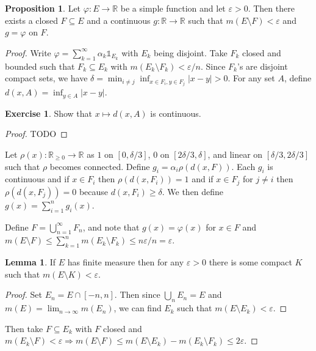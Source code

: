 \documentclass{article}
\renewcommand{\implies}{\Rightarrow}
\newcommand{\R}{\mathbb{R}}
\theoremstyle{definition} %
\numberwithin{thm}{section} %
\newtheorem{lemma}[thm]{Lemma}
\newtheorem{prop}[thm]{Proposition}
\theoremstyle{definition} %
\newtheorem{exercise}[thm]{Exercise}
\begin{document}
\begin{prop}
    Let $\varphi: E \to \R$ be a simple function and let $\varepsilon > 0$. Then there exists a closed $F \subseteq E$ and a continuous $g: \R \to \R$ such that $m(E \setminus F) < \varepsilon$ and $g = \varphi$ on $F$.
\end{prop}
\begin{proof}
Write $\varphi = \sum_{k = 1}^\infty \alpha_k \mathds{1}_{E_k}$ with $E_k$ being disjoint. Take $F_k$ closed and bounded such that $F_k \subseteq E_k$ with $m(E_k \setminus F_k) < \varepsilon / n$. Since $F_k$'s are disjoint compact sets, we have $\delta = \min_{i \neq j}\inf_{x \in F_i, y \in F_j} |x - y| > 0$. For any set $A$, define $d(x, A) = \inf_{y \in A}|x - y|$.

\begin{exercise}
    Show that $x \mapsto d(x, A)$ is continuous.
\end{exercise}
\begin{proof}
    TODO
\end{proof}

Let $\rho(x): \R_{\geq 0} \to \R$ as $1$ on $[0, \delta/3]$, 0 on $[2\delta/3, \delta]$, and linear on $[\delta/3, 2\delta/3]$ such that $\rho$ becomes connected. Define $g_i = \alpha_i \rho(d(x, F))$. Each $g_i$ is continuous and if $x \in F_i$ then $\rho(d(x, F_i)) = 1$ and if $x \in F_j$ for $j \neq i$ then $\rho(d(x, F_j)) = 0$ because $d(x, F_i) \geq \delta$. We then define $g(x) = \sum_{i = 1}^n g_i(x)$.

Define $F = \bigcup_{n = 1}^\infty F_n$, and note that $g(x) = \varphi(x)$ for $x \in F$ and $m(E \setminus F) \leq \sum_{k = 1}^n m(E_k \setminus F_k) \leq n \varepsilon / n = \varepsilon$.

\begin{lemma}
    If $E$ has finite measure then for any $\varepsilon > 0$ there is some compact $K$ such that $m(E \setminus K) < \varepsilon$.
\end{lemma}
\begin{proof}
Set $E_n = E \cap [-n, n]$. Then since $\bigcup_n E_n = E$ and $m(E) = \lim_{n \to \infty} m(E_n)$, we can find $E_k$ such that $m(E \setminus E_k) < \varepsilon$.
\end{proof}

Then take $F \subseteq E_k$ with $F$ closed and $m(E_k \setminus F) < \varepsilon \implies m(E \setminus F) \leq m(E \setminus E_k) - m(E_k \setminus F_k) \leq 2 \varepsilon$.
\end{proof}
\end{document}
